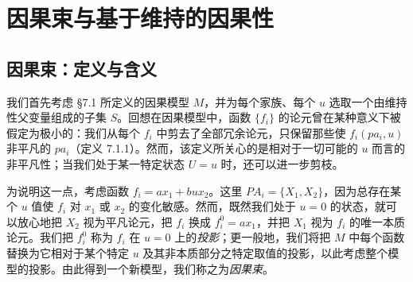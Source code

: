 \section{因果束与基于维持的因果性}

\subsection{因果束：定义与含义}

我们首先考虑 \S 7.1 所定义的因果模型 $M$，并为每个家族、每个 $u$ 选取一个由维持性父变量组成的子集 $S$。回想在因果模型中，函数 $\{f_i\}$ 的论元曾在某种意义下被假定为极小的：我们从每个 $f_i$ 中剪去了全部冗余论元，只保留那些使 $f_i(pa_i,u)$ 非平凡的 $pa_i$（定义 7.1.1）。然而，该定义所关心的是相对于一切可能的 $u$ 而言的非平凡性；当我们处于某一特定状态 $U=u$ 时，还可以进一步剪枝。

为说明这一点，考虑函数 $f_i=ax_1+bux_2$。这里 $PA_i=\{X_1,X_2\}$，因为总存在某个 $u$ 值使 $f_i$ 对 $x_1$ 或 $x_2$ 的变化敏感。然而，既然我们处于 $u=0$ 的状态，就可以放心地把 $X_2$ 视为平凡论元，把 $f_i$ 换成 $f_i^0=ax_1$，并把 $X_1$ 视为 $f_i$ 的唯一本质论元。我们把 $f_i^0$ 称为 $f_i$ 在 $u=0$ 上的\emph{投影}；更一般地，我们将把 $M$ 中每个函数替换为它相对于某个特定 $u$ 及其非本质部分之特定取值的投影，以此考虑整个模型的投影。由此得到一个新模型，我们称之为\emph{因果束}。

